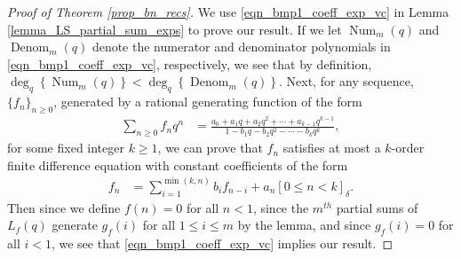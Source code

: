 \documentclass[12pt,reqno,a4letter]{article}
\numberwithin{figure}{section}
\numberwithin{table}{section}
\numberwithin{equation}{section}
\newcommand{\Iverson}[1]{\ensuremath{\left[#1\right]_{\delta}}}
\DeclareMathOperator{\Num}{Num}
\DeclareMathOperator{\Denom}{Denom}
\theoremstyle{plain}
\numberwithin{theorem}{section}
\theoremstyle{definition}
\begin{document}
\begin{proof}[Proof of Theorem \ref{prop_bn_recs}]
We use \eqref{eqn_bmp1_coeff_exp_vc} in Lemma \ref{lemma_LS_partial_sum_exps} 
to prove our result. 
If we let $\Num_m(q)$ and $\Denom_m(q)$ denote the numerator and denominator 
polynomials in \eqref{eqn_bmp1_coeff_exp_vc}, respectively, we see that by 
definition, $\deg_q \left\{\Num_m(q)\right\} < \deg_q \left\{ \Denom_m(q) \right\}$. 
Next, for any sequence, $\{f_n\}_{n \geq 0}$, generated by a rational generating function 
of the form 
\begin{align*} 
\sum_{n \geq 0} f_n q^n & = \frac{a_0+a_1q+a_2q^2+\cdots+a_{k-1}q^{k-1}}{ 
     1 - b_1 q - b_2 q^2 - \cdots - b_k q^{k}}, 
\end{align*} 
for some fixed integer $k \geq 1$, we can prove that $f_n$ satisfies 
at most a  
$k$-order finite difference equation with constant coefficients of the form 
\cite[\S 2.3]{LANDO-GFLECT} 
\begin{align*} 
f_n & = \sum_{i=1}^{\min(k, n)} b_i f_{n-i} + a_n \Iverson{0 \leq n < k}. 
\end{align*} 
Then since we define $f(n) = 0$ for all $n < 1$, 
since the $m^{th}$ partial sums of $L_f(q)$ generate $g_f(i)$ for all 
$1 \leq i \leq m$ by the lemma, and since $g_f(i) = 0$ for all $i < 1$, 
we see that \eqref{eqn_bmp1_coeff_exp_vc} implies our result. 
\end{proof}
\end{document}
